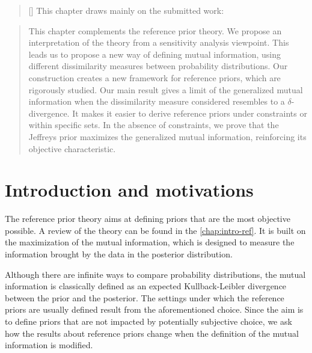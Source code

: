 
\begin{abstract}[\hspace*{-10pt}]
    This chapter draws mainly on the submitted work:   %
\end{abstract}

\begin{abstract}
    This chapter complements the reference prior theory. We propose an interpretation of the theory from a sensitivity analysis viewpoint. This leads us to propose a new way of defining mutual information, using different dissimilarity measures between probability distributions. 
    Our construction  creates a new framework for reference priors, which are rigorously studied.
    Our main result gives a limit of the generalized mutual information when the dissimilarity measure considered resembles to a $\delta$-divergence.
    It makes it easier to derive reference priors under constraints or within specific sets. In the absence of constraints, we prove that the Jeffreys prior maximizes the generalized mutual information, reinforcing its objective characteristic.
\end{abstract}

\minitoc

\section{Introduction and motivations}

The reference prior theory aims at defining priors that are the most objective possible. A review of the theory can be found in the \cref{chap:intro-ref}. It is built on the maximization of the mutual information, which is designed to measure the information brought by the data in the posterior distribution.

Although there are infinite ways %
to compare probability distributions, the mutual information is classically defined as an expected Kullback-Leibler divergence between the prior and the posterior.
The settings under which the reference priors are usually defined result from the aforementioned choice. Since the aim is to define priors that are not impacted by potentially subjective choice, we ask how the results about reference priors change when the definition of the mutual information is modified.

